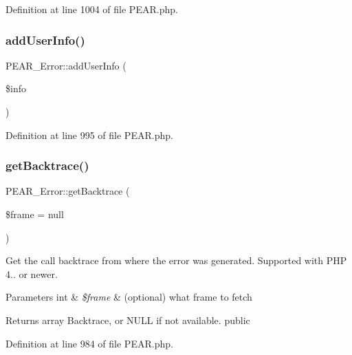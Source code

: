 Definition at line 1004 of file P\+E\+A\+R.\+php.

\hypertarget{classPEAR__Error_a229db64a10b64f41644ec19cf3c1e47b}{}\label{classPEAR__Error_a229db64a10b64f41644ec19cf3c1e47b} 
\subsubsection{\texorpdfstring{add\+User\+Info()}{addUserInfo()}}
{\footnotesize\ttfamily P\+E\+A\+R\+\_\+\+Error\+::add\+User\+Info (\begin{DoxyParamCaption}\item[{}]{\$info }\end{DoxyParamCaption})}



Definition at line 995 of file P\+E\+A\+R.\+php.

\hypertarget{classPEAR__Error_a7892a046070c977e5fcba9fcb749673d}{}\label{classPEAR__Error_a7892a046070c977e5fcba9fcb749673d} 
\subsubsection{\texorpdfstring{get\+Backtrace()}{getBacktrace()}}
{\footnotesize\ttfamily P\+E\+A\+R\+\_\+\+Error\+::get\+Backtrace (\begin{DoxyParamCaption}\item[{}]{\$frame = {\ttfamily null} }\end{DoxyParamCaption})}

Get the call backtrace from where the error was generated. Supported with P\+HP 4.. or newer.


\begin{DoxyParams}[1]{Parameters}
int & {\em \$frame} & (optional) what frame to fetch \\
\hline
\end{DoxyParams}
\begin{DoxyReturn}{Returns}
array Backtrace, or N\+U\+LL if not available.  public 
\end{DoxyReturn}


Definition at line 984 of file P\+E\+A\+R.\+php.

\hypertarget{classPEAR__Error_a8060f0ee49b7346e4ca6e04aa70ae25c}{}\label{classPEAR__Error_a8060f0ee49b7346e4ca6e04aa70ae25c} 
